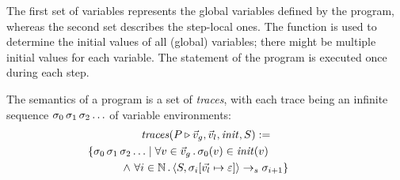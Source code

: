 \documentclass{article}
\begin{document}
The first set of variables represents the global variables defined by the program, whereas the second set describes the step-local
ones. The function is used to determine the initial values of all (global) variables; there might be multiple initial
values for each variable. The statement of the program is executed once during each step.

The semantics of a program is a set of \textit{traces}, with each trace being an infinite sequence $\sigma_0 \,
\sigma_1 \, \sigma_2 \ldots$ of variable environments:
\begin{multline*}
	\mathit{traces}(\prog \triangleright \toList{\var}_g, \toList{\var}_l, \mathit{init}, \stm) :=
	\\ \shoveright{
	\{ \varEnv_0 \, \varEnv_1 \, \varEnv_2 \ldots \mid 
		\forall \var \in \toList{\var}_g \, . \, \varEnv_0(\var) \in \mathit{init}(\var) \qquad \qquad}
	\\ \wedge \
		\forall i \in \mathbb{N} \, . \, \configuration{\stm, \varEnv_i[\toList{\var_l} \mapsto \missing]} \stmArrow \varEnv_{i+1} \}
\end{multline*}
\end{document}
